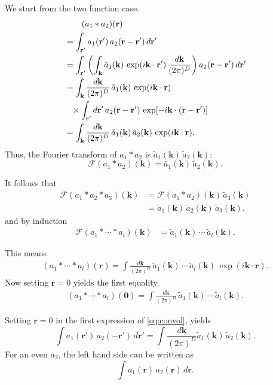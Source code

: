 \documentclass[aip,jcp,reprint,superscriptaddress]{revtex4-1}
\numberwithin{equation}{subsection}
\newcommand{\vct}[1]{\mathbf{#1}}
\providecommand{\vr}{} %
\renewcommand{\vr}{\vct{r}}
\newcommand{\vk}{\vct{k}}
\newcommand{\dvk}{\frac{d\vk}{(2\pi)^D}}
\newcommand{\FT}{\mathscr{F}}
\begin{document}
We start from the two function case.
%
\begin{align}
& \hphantom{=\int} (a_1 * a_2)(\vr)
\notag \\
&=
  \int_{\vr'}
    a_1(\vr') \,
    a_2(\vr - \vr') \, d\vr'
\notag \\
&=
  \int_{\vr'}
    \left(
      \int_\vk \tilde{a}_1(\vk) \, \exp(i\vk\cdot\vr') \, \dvk
    \right)
    a_2(\vr - \vr') \, d\vr'
\notag \\
&=
  \int_\vk \dvk \,
  \tilde{a}_1(\vk) \,
  \exp(i\vk\cdot\vr)
\notag \\
&\hphantom{=}\times
  \int_{\vr'} d\vr' \,
    a_2(\vr - \vr') \, \exp[-i\vk\cdot(\vr - \vr')]
\notag \\
&=
  \int_\vk \dvk \,
  \tilde{a}_1(\vk) \,
  \tilde{a}_2(\vk) \,
  \exp(i\vk\cdot\vr).
  \label{eq:convol}
\end{align}
Thus, the Fourier transform of $a_1 * a_2$ is
$\tilde{a}_1(\vk) \, \tilde{a}_2(\vk)$:
\[
  \FT(a_1 * a_2)(\vk) = \tilde{a_1}(\vk) \, \tilde{a}_2(\vk).
\]

It follows that
\begin{align*}
  \FT(a_1 * a_2 * a_3)(\vk)
&= \FT(a_1 * a_2)(\vk) \, \tilde{a}_3(\vk)
  \\
&= \tilde{a}_1(\vk) \, \tilde{a}_2(\vk) \, \tilde{a}_3(\vk).
\end{align*}
and by induction
\begin{align*}
  \FT(a_1 * \cdots * a_l)(\vk)
&= \tilde{a}_1(\vk) \, \cdots \, \tilde{a}_l(\vk).
\end{align*}

This means
\begin{align*}
  (a_1 * \cdots * a_l)(\vr)
= \int \dvk \, \tilde{a}_1(\vk) \, \cdots \, \tilde{a}_l(\vk)
  \, \exp(i\vk\cdot\vr).
\end{align*}
%
Now setting $\vr = 0$ yields the first equality.
\begin{align*}
  (a_1 * \cdots * a_l)(\vct 0)
= \int \dvk \, \tilde{a}_1(\vk) \, \cdots \, \tilde{a}_l(\vk).
\end{align*}

Setting $\vr = 0$ in the first expression of \eqref{eq:convol}, yields
\[
  \int a_1(\vr') \, a_2(-\vr') \, d\vr'
= \int \dvk \tilde{a}_1(\vk) \, \tilde{a}_2(\vk).
\]
For an even $a_2$,
the left hand side can be written as
\[
  \int a_1(\vr) \, a_2(\vr) \, d\vr.
\]



%
\end{document}
